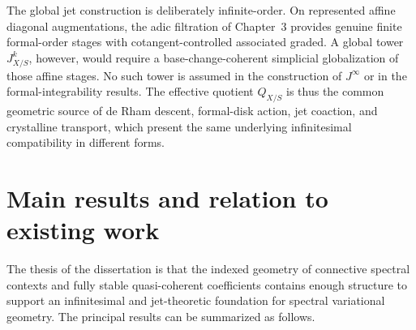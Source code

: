 The global jet construction is deliberately infinite-order.  On represented
affine diagonal augmentations, the adic filtration of Chapter~3 provides
genuine finite formal-order stages with cotangent-controlled associated
graded.  A global tower \(J^k_{X/S}\), however, would require a
base-change-coherent simplicial globalization of those affine stages.  No
such tower is assumed in the construction of \(J^\infty\) or in the
formal-integrability results.  The effective quotient \(Q_{X/S}\) is thus the
common geometric source of de Rham descent, formal-disk action, jet coaction, and crystalline transport,
which present the same underlying infinitesimal compatibility in different
forms.


\section{Main results and relation to existing work}
\label{sec:intro-thesis-results}

The thesis of the dissertation is that the indexed geometry of connective
spectral contexts and fully stable quasi-coherent coefficients contains
enough structure to support an infinitesimal and jet-theoretic foundation for
spectral variational geometry.  The principal results can be summarized as
follows.

